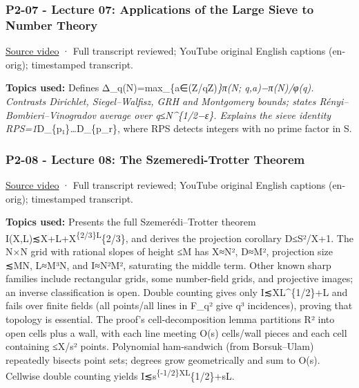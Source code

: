 \subsubsection{P2-07 - Lecture 07: Applications of the Large Sieve to Number Theory}\label{04-visual-computing-ii-ch036-p2-07---lecture-07-applications-of-the-large-sieve-to-number-theory}

\href{https://www.youtube.com/watch?v=-UJgxLaFzfM}{Source video} · Full transcript reviewed; YouTube original English captions (en-orig); timestamped transcript.

\textbf{Topics used:} Defines Δ\_q(N)=max\_\{a∈(Z/qZ)\emph{\}\textbar π(N; q,a)−π(N)/φ(q)\textbar. Contrasts Dirichlet, Siegel--Walfisz, GRH and Montgomery bounds; states Rényi--Bombieri--Vinogradov average over q≤N\^{}\{1/2−ε\}. Explains the sieve identity RPS=1}D\_\{p₁\}\emph{\ldots{}}D\_\{p\_r\}, where RPS detects integers with no prime factor in S.

\subsubsection{P2-08 - Lecture 08: The Szemeredi-Trotter Theorem}\label{04-visual-computing-ii-ch036-p2-08---lecture-08-the-szemeredi-trotter-theorem}

\href{https://www.youtube.com/watch?v=3h0jvsOnTIc}{Source video} · Full transcript reviewed; YouTube original English captions (en-orig); timestamped transcript.

\textbf{Topics used:} Presents the full Szemerédi--Trotter theorem I(X,L)≲\textbar X\textbar+\textbar L\textbar+\textbar X\textbar{}\textsuperscript{\{2/3\}\textbar L\textbar{}}\{2/3\}, and derives the projection corollary \textbar D\textbar≤S²/\textbar X\textbar+1. The N×N grid with rational slopes of height ≤M has \textbar X\textbar≈N², \textbar D\textbar≈M², projection size ≲MN, \textbar L\textbar≈M³N, and I≈N²M², saturating the middle term. Other known sharp families include rectangular grids, some number-field grids, and projective images; an inverse classification is open. Double counting gives only I≲\textbar X\textbar\textbar L\textbar\^{}\{1/2\}+\textbar L\textbar{} and fails over finite fields (all points/all lines in F\_q² give q³ incidences), proving that topology is essential. The proof's cell-decomposition lemma partitions R² into open cells plus a wall, with each line meeting O(s) cells/wall pieces and each cell containing ≤\textbar X\textbar/s² points. Polynomial ham-sandwich (from Borsuk--Ulam) repeatedly bisects point sets; degrees grow geometrically and sum to O(s). Cellwise double counting yields I≲s\textsuperscript{\{-1/2\}\textbar X\textbar\textbar L\textbar{}}\{1/2\}+s\textbar L\textbar.

